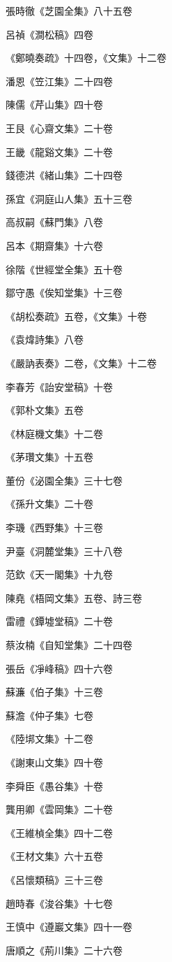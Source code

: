 張時徹《芝園全集》八十五卷

呂禎《澗松稿》四卷

《鄭曉奏疏》十四卷，《文集》十二卷

潘恩《笠江集》二十四卷

陳儒《芹山集》四十卷

王艮《心齋文集》二十卷

王畿《龍谿文集》二十卷

錢德洪《緒山集》二十四卷

孫宜《洞庭山人集》五十三卷

高叔嗣《蘇門集》八卷

呂本《期齋集》十六卷

徐階《世經堂全集》五十卷

鄒守愚《俟知堂集》十三卷

《胡松奏疏》五卷，《文集》十卷

《袁煒詩集》八卷

《嚴訥表奏》二卷，《文集》十二卷

李春芳《詒安堂稿》十卷

《郭朴文集》五卷

《林庭機文集》十二卷

《茅瓚文集》十五卷

董份《泌園全集》三十七卷

《孫升文集》二十卷

李璣《西野集》十三卷

尹臺《洞麓堂集》三十八卷

范欽《天一閣集》十九卷

陳堯《梧岡文集》五卷、詩三卷

雷禮《鐔墟堂稿》二十卷

蔡汝楠《自知堂集》二十四卷

張岳《凈峰稿》四十六卷

蘇濂《伯子集》十三卷

蘇澹《仲子集》七卷

《陸垹文集》十二卷

《謝東山文集》四十卷

李舜臣《愚谷集》十卷

龔用卿《雲岡集》二十卷

《王維楨全集》四十二卷

《王材文集》六十五卷

《呂懷類稿》三十三卷

趙時春《浚谷集》十七卷

王慎中《遵巖文集》四十一卷

唐順之《荊川集》二十六卷

